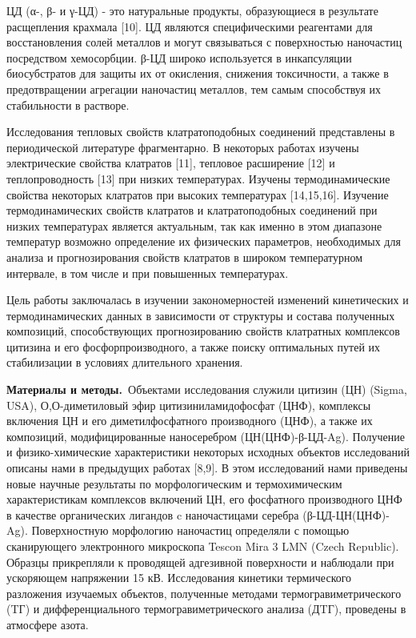 ЦД (α-, β- и γ-ЦД) - это натуральные продукты, образующиеся в результате
расщепления крахмала {[}10{]}. ЦД являются специфическими реагентами для
восстановления солей металлов и могут связываться с поверхностью
наночастиц посредством хемосорбции. β-ЦД широко используется в
инкапсуляции биосубстратов для защиты их от окисления, снижения
токсичности, а также в предотвращении агрегации наночастиц металлов, тем
самым способствуя их стабильности в растворе.

Исследования тепловых свойств клатратоподобных соединений представлены в
периодической литературе фрагментарно. В некоторых работах изучены
электрические свойства клатратов {[}11{]}, тепловое расширение {[}12{]}
и теплопроводность {[}13{]} при низких температурах. Изучены
термодинамические свойства некоторых клатратов при высоких температурах
{[}14,15,16{]}. Изучение термодинамических свойств клатратов и
клатратоподобных соединений при низких температурах является актуальным,
так как именно в этом диапазоне температур возможно определение их
физических параметров, необходимых для анализа и прогнозирования свойств
клатратов в широком температурном интервале, в том числе и при
повышенных температурах.

Цель работы заключалась в изучении закономерностей изменений
кинетических и термодинамических данных в зависимости от структуры и
состава полученных композиций, способствующих прогнозированию свойств
клатратных комплексов цитизина и его фосфорпроизводного, а также поиску
оптимальных путей их стабилизации в условиях длительного хранения.

{\bfseries Материалы и методы.}~Объектами исследования служили цитизин (ЦН)
(Sigma, USA), О,О-диметиловый эфир цитизиниламидофосфат (ЦНФ), комплексы
включения ЦН и его диметилфосфатного производного (ЦНФ), а также их
композиций, модифицированные наносеребром (ЦН(ЦНФ)-β-ЦД-Ag). Получение и
физико-химические характеристики некоторых исходных объектов
исследований описаны нами в предыдущих работах {[}8,9{]}. В этом
исследований нами приведены новые научные результаты по морфологическим
и термохимическим характеристикам комплексов включений ЦН, его
фосфатного производного ЦНФ в качестве органических лигандов c
наночастицами серебра (β-ЦД-ЦН(ЦНФ)-Ag). Поверхностную морфологию
наночастиц определяли с помощью сканирующего электронного микроскопа
Tescon Mira 3 LMN (Czech Republic). Образцы прикрепляли к проводящей
адгезивной поверхности и наблюдали при ускоряющем напряжении 15 кВ.
Исследования кинетики термического разложения изучаемых объектов,
полученные методами термогравиметрического (TГ) и дифференциального
термогравиметрического анализа (ДTГ), проведены в атмосфере азота.

